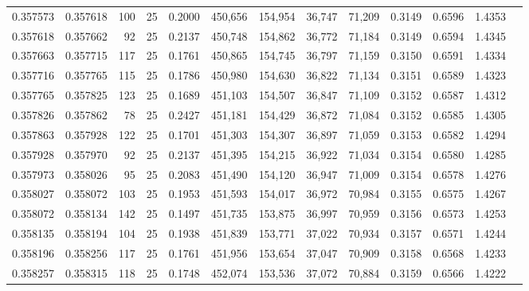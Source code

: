 \begin{tabular}{rrrrrrrrrrrrr}
0.357573 & 0.357618 &   100 &  25 &                                     0.2000 & 450,656 & 154,954 &  36,747 &  71,209 & 0.3149 & 0.6596 & 1.4353 \\
0.357618 & 0.357662 &    92 &  25 &                                     0.2137 & 450,748 & 154,862 &  36,772 &  71,184 & 0.3149 & 0.6594 & 1.4345 \\
0.357663 & 0.357715 &   117 &  25 &                                     0.1761 & 450,865 & 154,745 &  36,797 &  71,159 & 0.3150 & 0.6591 & 1.4334 \\
0.357716 & 0.357765 &   115 &  25 &                                     0.1786 & 450,980 & 154,630 &  36,822 &  71,134 & 0.3151 & 0.6589 & 1.4323 \\
0.357765 & 0.357825 &   123 &  25 &                                     0.1689 & 451,103 & 154,507 &  36,847 &  71,109 & 0.3152 & 0.6587 & 1.4312 \\
0.357826 & 0.357862 &    78 &  25 &                                     0.2427 & 451,181 & 154,429 &  36,872 &  71,084 & 0.3152 & 0.6585 & 1.4305 \\
0.357863 & 0.357928 &   122 &  25 &                                     0.1701 & 451,303 & 154,307 &  36,897 &  71,059 & 0.3153 & 0.6582 & 1.4294 \\
0.357928 & 0.357970 &    92 &  25 &                                     0.2137 & 451,395 & 154,215 &  36,922 &  71,034 & 0.3154 & 0.6580 & 1.4285 \\
0.357973 & 0.358026 &    95 &  25 &                                     0.2083 & 451,490 & 154,120 &  36,947 &  71,009 & 0.3154 & 0.6578 & 1.4276 \\
0.358027 & 0.358072 &   103 &  25 &                                     0.1953 & 451,593 & 154,017 &  36,972 &  70,984 & 0.3155 & 0.6575 & 1.4267 \\
0.358072 & 0.358134 &   142 &  25 &                                     0.1497 & 451,735 & 153,875 &  36,997 &  70,959 & 0.3156 & 0.6573 & 1.4253 \\
0.358135 & 0.358194 &   104 &  25 &                                     0.1938 & 451,839 & 153,771 &  37,022 &  70,934 & 0.3157 & 0.6571 & 1.4244 \\
0.358196 & 0.358256 &   117 &  25 &                                     0.1761 & 451,956 & 153,654 &  37,047 &  70,909 & 0.3158 & 0.6568 & 1.4233 \\
0.358257 & 0.358315 &   118 &  25 &                                     0.1748 & 452,074 & 153,536 &  37,072 &  70,884 & 0.3159 & 0.6566 & 1.4222 \\

\end{tabular}
